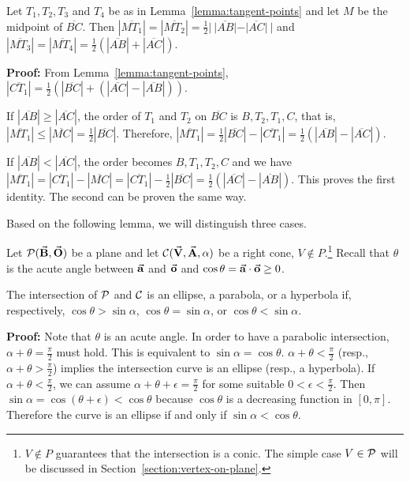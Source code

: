 \begin{lemma}
\label{lemma:focal-length}
     Let $T_1,T_2,T_3$ and $T_4$ be as in Lemma~\ref{lemma:tangent-points} 
and let $M$ be the midpoint of $\overline{BC}$.
Then $|\overline{MT_1}|=|\overline{MT_2}|
=\frac{1}{2}|\ |\overline{AB}|-|\overline{AC}|\ |$ and
$|\overline{MT_3}|=|\overline{MT_4}|
=\frac{1}{2}(|\overline{AB}|+|\overline{AC}|)$.
\end{lemma}
{\bf Proof:} From Lemma~\ref{lemma:tangent-points}, 
$|\overline{CT_1}|=
\frac{1}{2}(|\overline{BC}|+(|\overline{AC}|-|\overline{AB}|))$.

If $|\overline{AB}|\geq|\overline{AC}|$, the order of $T_1$ and $T_2$ on
$\overline{BC}$ is $B,T_2,T_1,C$, that is, 
$|\overline{MT_1}|\leq|\overline{MC}|=\frac{1}{2}|\overline{BC}|$.
Therefore, $|\overline{MT_1}|=\frac{1}{2}|\overline{BC}|-
|\overline{CT_1}|=\frac{1}{2}(|\overline{AB}|-|\overline{AC}|)$.

     If $|\overline{AB}|<|\overline{AC}|$, the order becomes $B,T_1,T_2,C$
and we have $|\overline{MT_1}|=|\overline{CT_1}|-|\overline{MC}|=
|\overline{CT_1}|-\frac{1}{2}|\overline{BC}|=\frac{1}{2}(|\overline{AC}|-
|\overline{AB}|)$.  
This proves the first identity.  The second can be proven the same way.  \QED

Based on the following lemma, we will distinguish three cases.

\begin{lemma}
\label{lemma:classification}
Let ${\cal P}(\vec{\bf B},\vec{\bf O})$ be a plane and 
let ${\cal C}(\vec{\bf V}, \vec{\bf A},\alpha)$ be a right cone, 
$V \not \in P$.\footnote{$V \not \in P$ guarantees that the 
	intersection is a conic.
	The simple case $V\in{\cal P}$ will be discussed in 
	Section~\ref{section:vertex-on-plane}.}
Recall that $\theta$
is the acute angle between $\vec{\bf a}$ and $\vec{\bf o}$ and 
$\cos\theta=\vec{\bf a}\cdot\vec{\bf o}\geq 0$.

     The intersection of ${\cal P}$ and ${\cal C}$
is an ellipse, a parabola, or a hyperbola if,
respectively, $\cos\theta>\sin\alpha$, $\cos\theta=\sin\alpha$, or 
$\cos\theta<\sin\alpha$.
\end{lemma}
{\bf Proof:}  Note that $\theta$ is an acute angle. 
In order to have a parabolic intersection, 
$\alpha+\theta=\frac{\pi}{2}$ must hold.  This is equivalent to
$\sin\alpha=\cos\theta$.
$\alpha+\theta<\frac{\pi}{2}$ (resp., $\alpha+\theta>\frac{\pi}{2}$)
implies the intersection curve is an ellipse (resp., a hyperbola).
If $\alpha+\theta<\frac{\pi}{2}$,
we can assume $\alpha+\theta+\epsilon=\frac{\pi}{2}$ for some suitable
$0<\epsilon<\frac{\pi}{2}$.  Then $\sin\alpha=\cos(\theta+\epsilon)<\cos\theta$
because $\cos\theta$ is a decreasing function in $[0,\pi]$.  Therefore 
the curve is an ellipse if and only if $\sin\alpha<\cos\theta$.
\QED

